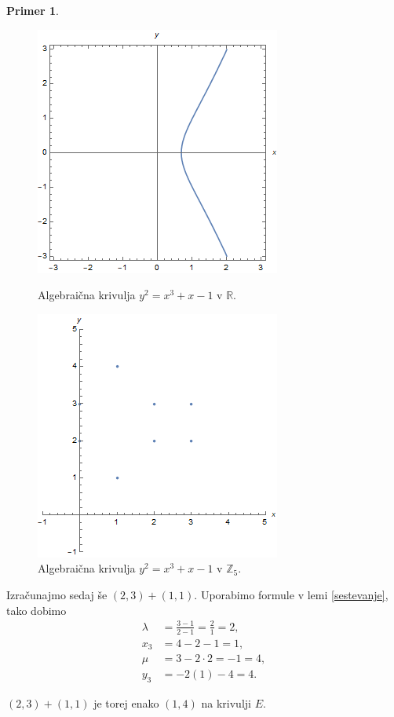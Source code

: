 \documentclass[12pt,a4paper,twoside]{article}
\theoremstyle{definition} %
\newtheorem{primer}[definicija]{Primer}
\theoremstyle{plain} %
\numberwithin{equation}{section}  %
\newcommand{\R}{\mathbb R}
\newcommand{\Z}{\mathbb Z}
\begin{document}
\begin{primer}
\begin{figure}[ht]
  \centering
\begin{minipage}{.45\textwidth}
\centering
  \includegraphics[scale = 0.5]{images/krivuljamod0.png}
  \caption[Primer algebraične krivulje.]{Algebraična krivulja $y^2 = x^3+x-1$ v $\R$.}
  \label{fig:krivuljamod0}
\end{minipage}%
\hfill
\begin{minipage}{.45\textwidth}
\centering
\includegraphics[scale=0.5]{images/krivuljamod1.png}
\caption[Presek algebraične krivulje z ravnino $z=1$.]{Algebraična krivulja $y^2 = x^3+x-1$ v $\Z_5$.}
\label{fig:krivuljamod1}
\end{minipage}
\end{figure}

Izračunajmo sedaj še $(2,3)+(1,1)$. Uporabimo formule v lemi \ref{sestevanje}, tako dobimo
\begin{align}
\lambda &{}=\frac{3-1}{2-1} = \frac{2}{1} = 2, \nonumber \\ 
x_3 &{} = 4-2-1 = 1, \nonumber \\
\mu &{}= 3-2\cdot 2 = -1 = 4, \nonumber \\
y_3 &{} = -2(1)-4 = 4. \nonumber
\end{align}

$(2,3)+(1,1)$ je torej enako $(1,4)$ na krivulji $E$.

\end{primer}
\end{document}
